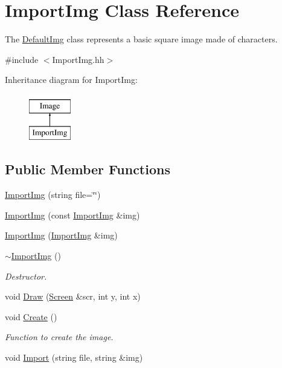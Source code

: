 \hypertarget{classImportImg}{\section{Import\-Img Class Reference}
\label{classImportImg}
}


The \hyperlink{classDefaultImg}{Default\-Img} class represents a basic square image made of characters.  




{\ttfamily \#include $<$Import\-Img.\-hh$>$}

Inheritance diagram for Import\-Img\-:\begin{figure}[H]
\begin{center}
\leavevmode
\includegraphics[height=2.000000cm]{classImportImg}
\end{center}
\end{figure}
\subsection*{Public Member Functions}
\begin{DoxyCompactItemize}
\item 
\hyperlink{classImportImg_a888292aaf716935b9e6baddea62af5d8}{Import\-Img} (string file=\char`\"{}\char`\"{})
\item 
\hyperlink{classImportImg_adfc26e250764e4388d9aee048a22a673}{Import\-Img} (const \hyperlink{classImportImg}{Import\-Img} \&img)
\item 
\hyperlink{classImportImg_a42a6d3113dfaa5c94fb43360d1641b6f}{Import\-Img} (\hyperlink{classImportImg}{Import\-Img} \&img)
\item 
\hypertarget{classImportImg_a5b0782a45e30d935067919e69169e809}{\hyperlink{classImportImg_a5b0782a45e30d935067919e69169e809}{$\sim$\-Import\-Img} ()}\label{classImportImg_a5b0782a45e30d935067919e69169e809}

\begin{DoxyCompactList}\small\item\em Destructor. \end{DoxyCompactList}\item 
void \hyperlink{classImportImg_a6a9c209e731c443ba060aa7d809a15e7}{Draw} (\hyperlink{classScreen}{Screen} \&scr, int y, int x)
\item 
\hypertarget{classImportImg_a7e1cc1bf176cedb14938519950719fa2}{void \hyperlink{classImportImg_a7e1cc1bf176cedb14938519950719fa2}{Create} ()}\label{classImportImg_a7e1cc1bf176cedb14938519950719fa2}

\begin{DoxyCompactList}\small\item\em Function to create the image. \end{DoxyCompactList}\item 
void \hyperlink{classImportImg_a20bf0509a73e9c08e89518a2ea9a868a}{Import} (string file, string \&img)
\end{DoxyCompactItemize}
